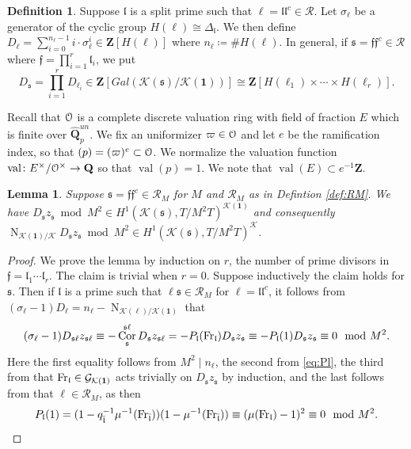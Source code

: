 \documentclass[leqno]{amsart}
\newtheorem{lem}[thm]{Lemma}
\theoremstyle{definition}
\newtheorem{defn}[thm]{Definition}
\theoremstyle{remark}
\newcommand{\id}{\mathbf{1}}
\newcommand{\eo}{\EuScript{O}}
\newcommand{\Q}{{\mathbf{Q}}}
\newcommand{\Z}{{\mathbf{Z}}}
\DeclareMathOperator{\Nr}{N}
\DeclareMathOperator{\Cor}{Cor}
\DeclareMathOperator{\val}{val} %
\DeclareMathOperator{\Gal}{\mathcal{G}}
\newcommand{\Fr}{\textnormal{Fr}} %
\newcommand{\ff}{\mathfrak{f}}
\newcommand{\fl}{\mathfrak{l}}
\newcommand{\fs}{\mathfrak{s}}
\newcommand{\K}{{\mathcal{K}}} %
\newcommand{\bl}{{\bar{\fl}}}
\begin{document}
\begin{defn}

Suppose $\fl$ is a split prime such that 
$\ell=\fl\fl^c\in \mathcal{R}$.
Let $\sigma_\ell$
be a generator of the cyclic group
$H(\ell)\cong \Delta_\fl$.
We then define
$D_\ell=\sum_{i=0}^{n_\ell-1}i\cdot \sigma_\ell^i
\in \Z[H(\ell)]$
where $n_\ell\coloneqq\#H(\ell)$.
In general, if $\fs=\ff\ff^c\in\mathcal{R}$
where $\ff=\prod_{i=1}^r\fl_i$, we put
\[
    D_\fs=\prod_{i=1}^r D_{\ell_i}\in 
    \Z[Gal(\K(\fs)/\K(\id))]\cong 
    \Z[H(\ell_1)\times\cdots\times H(\ell_r)].
\]
\end{defn}










Recall that $\eo$ is a complete discrete valuation ring
with field of fraction $E$ which is finite over $\widehat{\Q}_p^{un}$.
We fix an uniformizer $\varpi\in\eo$
and let $e$ be the ramification index,
so that $(p)=(\varpi)^e\subset \eo$.
We normalize the valuation function
$\val\colon E^\times/\eo^\times\to \Q$
so that $\val(p)=1$.
We note that $\val(E)\subset e^{-1}\Z$.






\begin{lem}

Suppose $\fs=\ff\ff^c\in\mathcal{R}_M$
for $M$ and $\mathcal{R}_M$ as in Defintion \ref{def:RM}.
We have $D_{\fs}z_{\fs}\bmod M^2\in 
H^1(\K(\fs),T/{M^2}T)^{\K(\id)}$
and consequently
$\Nr_{\K(\id)/\K}D_\fs z_\fs\bmod M^2\in
H^1(\K(\fs),T/{M^2}T)^{\K}$.
\end{lem}

\begin{proof}

We prove the lemma by induction on $r$,
the number of prime divisors in  $\ff=\fl_1\cdots\fl_r$.
The claim is trivial when $r=0$.
Suppose inductively the claim holds for $\fs$.
Then if $\fl$ is a prime such that 
$\ell\fs\in\mathcal{R}_M$ for $\ell=\fl\fl^c$,
it follows from 
$(\sigma_\ell-1)D_\ell=n_\ell-\Nr_{\K(\ell)/\K(\id)}$
that
\[
	 (\sigma_\ell-1)D_{\fs\ell}z_{\fs\ell}\equiv
	 -\Cor^{\fs\ell}_{\fs}D_{\fs}z_{\fs\ell}=
	 -P_\fl(\Fr_{\fl})D_{\fs}z_{\fs} \equiv
	 -P_\fl(1)D_{\fs}z_{\fs}\equiv 0\mod M^2.
\]
Here the first equality follows from $M^2\mid n_\ell$,
the second from \eqref{eq:Pl},
the third from that
$\Fr_\fl\in \Gal_{\K(\id)}$ acts trivially on $D_\fs z_\fs$
by induction,
and the last follows from that $\ell\in\mathcal{R}_M$, as then
\[P_\fl(1)=(1-q_\bl^{-1}\mu^{-1}(\Fr_\bl))(1-\mu^{-1}(\Fr_\bl))
\equiv (\mu(\Fr_\fl)-1)^2 \equiv 0\mod M^2.\]
\end{proof}
\end{document}
